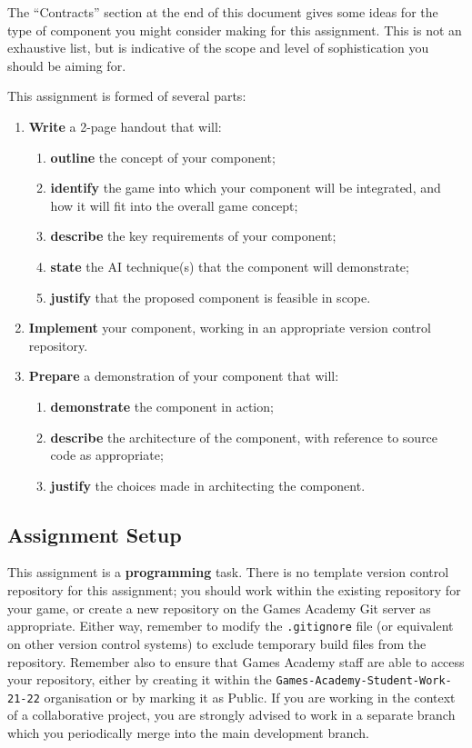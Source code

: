 \documentclass{../../fal_assignment}
\begin{document}
The ``Contracts'' section at the end of this document gives some ideas for the type of component you might consider making for this assignment.
This is not an exhaustive list, but is indicative of the scope and level of sophistication you should be aiming for.

This assignment is formed of several parts:
\begin{enumerate}[label=(\Alph*)]
	\item \textbf{Write} a 2-page handout that will:
		\begin{enumerate}[label=(\roman*)]
			\item \textbf{outline} the concept of your component;
			\item \textbf{identify} the game into which your component will be integrated, and how it will fit into
				the overall game concept;
			\item \textbf{describe} the key requirements of your component;
			\item \textbf{state} the AI technique(s) that the component will demonstrate;
			\item \textbf{justify} that the proposed component is feasible in scope.
		\end{enumerate}
    \item \textbf{Implement} your component, working in an appropriate version control repository.
    \item \textbf{Prepare} a demonstration of your component that will:
		\begin{enumerate}[label=(\roman*)]
			\item \textbf{demonstrate} the component in action;
			\item \textbf{describe} the architecture of the component, with reference to source code as appropriate;
			\item \textbf{justify} the choices made in architecting the component.
		\end{enumerate}
\end{enumerate}

\subsection*{Assignment Setup}

This assignment is a \textbf{programming} task.
There is no template version control repository for this assignment;
you should work within the existing repository for your game,
or create a new repository on the Games Academy Git server as appropriate.
Either way, remember to modify the \texttt{.gitignore} file (or equivalent on other version control systems) to exclude temporary build files
from the repository.
Remember also to ensure that Games Academy staff are able to access your repository,
either by creating it within the \texttt{Games-Academy-Student-Work-21-22} organisation
or by marking it as Public.
If you are working in the context of a collaborative project,
you are strongly advised to work in a separate branch which you periodically merge into the main development branch.
\end{document}
